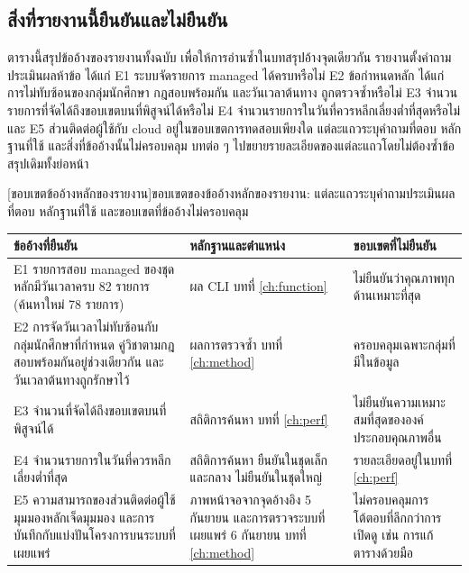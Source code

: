 \documentclass[12pt,a4paper]{article}
\begin{document}
\subsection{สิ่งที่รายงานนี้ยืนยันและไม่ยืนยัน}\label{ch:claims}
ตารางนี้สรุปข้ออ้างของรายงานทั้งฉบับ เพื่อให้การอ่านซ้ำในบทสรุปอ้างจุดเดียวกัน รายงานตั้งคำถามประเมินผลห้าข้อ ได้แก่ E1 ระบบจัดรายการ managed ได้ครบหรือไม่ E2 ข้อกำหนดหลัก ได้แก่ การไม่ทับซ้อนของกลุ่มนักศึกษา กฎสอบพร้อมกัน และวันเวลาต้นทาง ถูกตรวจซ้ำหรือไม่ E3 จำนวนรายการที่จัดได้ถึงขอบเขตบนที่พิสูจน์ได้หรือไม่ E4 จำนวนรายการในวันที่ควรหลีกเลี่ยงต่ำที่สุดหรือไม่ และ E5 ส่วนติดต่อผู้ใช้กับ cloud อยู่ในขอบเขตการทดสอบเพียงใด แต่ละแถวระบุคำถามที่ตอบ หลักฐานที่ใช้ และสิ่งที่ข้ออ้างนั้นไม่ครอบคลุม บทต่อ ๆ ไปขยายรายละเอียดของแต่ละแถวโดยไม่ต้องซ้ำข้อสรุปเดิมทั้งย่อหน้า

\begin{center}\begin{minipage}{\textwidth}\centering
{}[ขอบเขตข้ออ้างหลักของรายงาน]{ขอบเขตของข้ออ้างหลักของรายงาน: แต่ละแถวระบุคำถามประเมินผลที่ตอบ หลักฐานที่ใช้ และขอบเขตที่ข้ออ้างไม่ครอบคลุม}\label{tab:claims}
\begin{tabularx}{\textwidth}{@{}L{0.30\textwidth}L{0.26\textwidth}Y@{}}\toprule
ข้ออ้างที่ยืนยัน & หลักฐานและตำแหน่ง & ขอบเขตที่ไม่ยืนยัน \\\midrule
E1 รายการสอบ managed ของชุดหลักมีวันเวลาครบ 82 รายการ (ค้นหาใหม่ 78 รายการ) & ผล CLI บทที่ \ref{ch:function} & ไม่ยืนยันว่าคุณภาพทุกด้านเหมาะที่สุด \\
E2 การจัดวันเวลาไม่ทับซ้อนกับกลุ่มนักศึกษาที่กำหนด คู่วิชาตามกฎสอบพร้อมกันอยู่ช่วงเดียวกัน และวันเวลาต้นทางถูกรักษาไว้ & ผลการตรวจซ้ำ บทที่ \ref{ch:method} & ครอบคลุมเฉพาะกลุ่มที่มีในข้อมูล \\
E3 จำนวนที่จัดได้ถึงขอบเขตบนที่พิสูจน์ได้ & สถิติการค้นหา บทที่ \ref{ch:perf} & ไม่ยืนยันความเหมาะสมที่สุดขององค์ประกอบคุณภาพอื่น \\
E4 จำนวนรายการในวันที่ควรหลีกเลี่ยงต่ำที่สุด & สถิติการค้นหา ยืนยันในชุดเล็กและกลาง ไม่ยืนยันในชุดใหญ่ & รายละเอียดอยู่ในบทที่ \ref{ch:perf} \\
E5 ความสามารถของส่วนติดต่อผู้ใช้มุมมองหลักเจ็ดมุมมอง และการบันทึกกับแบ่งปันโครงการบนระบบที่เผยแพร่ & ภาพหน้าจอจากจุดอ้างอิง 5 กันยายน และการตรวจระบบที่เผยแพร่ 6 กันยายน บทที่ \ref{ch:method} & ไม่ครอบคลุมการโต้ตอบที่ลึกกว่าการเปิดดู เช่น การแก้ตารางด้วยมือ \\\bottomrule
\end{tabularx}\end{minipage}\end{center}
\end{document}

